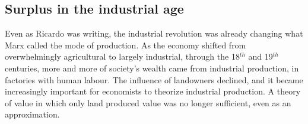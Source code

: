 
\subsection{Surplus in the industrial age}

Even as Ricardo was writing, the industrial revolution was already changing what Marx called the mode of production.  As the economy shifted  from overwhelmingly agricultural to largely industrial,  through %
the 18$^{th}$  and 19$^{th}$ centuries, more and more of society's wealth came from industrial production, in factories with human labour. The influence of landowners declined, and it became increasingly important for economists to theorize industrial production. A theory of value in which only land produced value was no longer sufficient, even as an approximation. 




